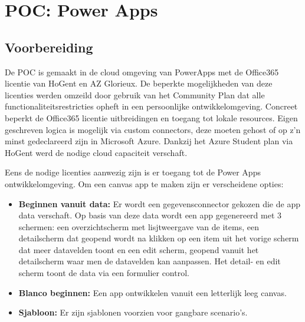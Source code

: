 
\chapter{POC: Power Apps}
\label{ch:powerapps-poc}



\section{Voorbereiding}
\label{sec:voorbereiding-pa}

De POC is gemaakt in de cloud omgeving van PowerApps met de Office365 licentie van HoGent en AZ Glorieux. De beperkte mogelijkheden van deze licenties werden omzeild door gebruik van het Community Plan dat alle functionaliteitsrestricties opheft in een persoonlijke ontwikkelomgeving. Concreet beperkt de Office365 licentie uitbreidingen en toegang tot lokale resources. Eigen geschreven logica is mogelijk via custom connectors, deze moeten gehost of op z'n minst gedeclareerd zijn in Microsoft Azure. Dankzij het Azure Student plan via HoGent werd de nodige cloud capaciteit verschaft.

Eens de nodige licenties aanwezig zijn is er toegang tot de Power Apps ontwikkelomgeving. Om een canvas app te maken zijn er verscheidene opties:
\begin{itemize}
    \item \textbf{Beginnen vanuit data:} Er wordt een gegevensconnector gekozen die de app data verschaft. Op basis van deze data wordt een app gegenereerd met 3 schermen: een overzichtscherm met lisjtweergave van de items, een detailscherm dat geopend wordt na klikken op een item uit het vorige scherm dat meer datavelden toont en een edit scherm, geopend vanuit het detailscherm waar men de datavelden kan aanpassen. Het detail- en edit scherm toont de data via een formulier control.
    \item \textbf{Blanco beginnen:} Een app ontwikkelen vanuit een letterlijk leeg canvas.
    \item \textbf{Sjabloon:} Er zijn sjablonen voorzien voor gangbare scenario's.
\end{itemize}

